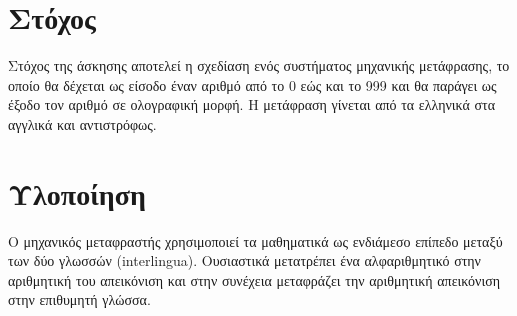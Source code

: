 \documentclass[a4paper,12pt]{article}
\begin{document}
\section{Στόχος}
Στόχος της άσκησης αποτελεί η σχεδίαση ενός συστήματος μηχανικής μετάφρασης, το οποίο θα δέχεται ως είσοδο έναν αριθμό από το 0 εώς και το 999 και θα παράγει ως έξοδο τον αριθμό σε ολογραφική μορφή. Η μετάφραση γίνεται από τα ελληνικά στα αγγλικά και αντιστρόφως. 
\section{Υλοποίηση}
Ο μηχανικός μεταφραστής χρησιμοποιεί τα μαθηματικά ως ενδιάμεσο επίπεδο μεταξύ των δύο γλωσσών (interlingua). Ουσιαστικά μετατρέπει ένα αλφαριθμητικό στην αριθμητική του απεικόνιση και στην συνέχεια μεταφράζει την αριθμητική απεικόνιση στην επιθυμητή γλώσσα.
		
\end{document}

